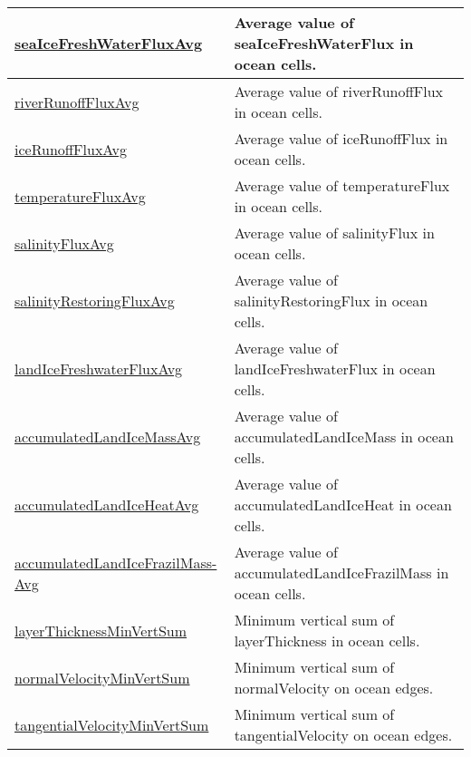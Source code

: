 {\begin{center}
\begin{longtable}{| p{2.0in} | p{4.0in} |}
    \hline
    \hyperref[subsec:var_sec_globalStatsAM_seaIceFreshWaterFluxAvg]{seaIceFreshWaterFluxAvg} & Average value of seaIceFreshWaterFlux in ocean cells. \\
    \hline
    \hyperref[subsec:var_sec_globalStatsAM_riverRunoffFluxAvg]{riverRunoffFluxAvg} & Average value of riverRunoffFlux in ocean cells. \\
    \hline
    \hyperref[subsec:var_sec_globalStatsAM_iceRunoffFluxAvg]{iceRunoffFluxAvg} & Average value of iceRunoffFlux in ocean cells. \\
    \hline
    \hyperref[subsec:var_sec_globalStatsAM_temperatureFluxAvg]{temperatureFluxAvg} & Average value of temperatureFlux in ocean cells. \\
    \hline
    \hyperref[subsec:var_sec_globalStatsAM_salinityFluxAvg]{salinityFluxAvg} & Average value of salinityFlux in ocean cells. \\
    \hline
    \hyperref[subsec:var_sec_globalStatsAM_salinityRestoringFluxAvg]{salinityRestoringFluxAvg} & Average value of salinityRestoringFlux in ocean cells. \\
    \hline
    \hyperref[subsec:var_sec_globalStatsAM_landIceFreshwaterFluxAvg]{landIceFreshwaterFluxAvg} & Average value of landIceFreshwaterFlux in ocean cells. \\
    \hline
    \hyperref[subsec:var_sec_globalStatsAM_accumulatedLandIceMassAvg]{accumulatedLandIceMassAvg} & Average value of accumulatedLandIceMass in ocean cells. \\
    \hline
    \hyperref[subsec:var_sec_globalStatsAM_accumulatedLandIceHeatAvg]{accumulatedLandIceHeatAvg} & Average value of accumulatedLandIceHeat in ocean cells. \\
    \hline
    \hyperref[subsec:var_sec_globalStatsAM_accumulatedLandIceFrazilMassAvg]{accumulatedLandIceFrazilMass-}\hyperref[subsec:var_sec_globalStatsAM_accumulatedLandIceFrazilMassAvg]{Avg}  & Average value of accumulatedLandIceFrazilMass in ocean cells. \\
    \hline
    \hyperref[subsec:var_sec_globalStatsAM_layerThicknessMinVertSum]{layerThicknessMinVertSum} & Minimum vertical sum of layerThickness in ocean cells. \\
    \hline
    \hyperref[subsec:var_sec_globalStatsAM_normalVelocityMinVertSum]{normalVelocityMinVertSum} & Minimum vertical sum of normalVelocity on ocean edges. \\
    \hline
    \hyperref[subsec:var_sec_globalStatsAM_tangentialVelocityMinVertSum]{tangentialVelocityMinVertSum} & Minimum vertical sum of tangentialVelocity on ocean edges. \\

\end{longtable}
\end{center}}
